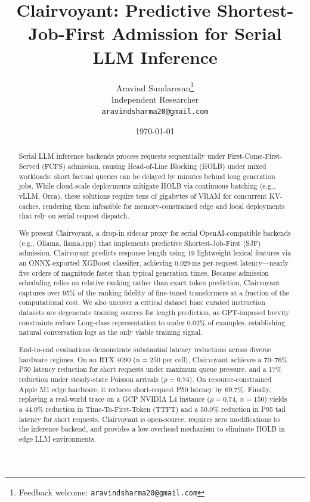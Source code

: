 \documentclass[10pt]{article}
\title{\textbf{Clairvoyant: Predictive Shortest-Job-First Admission for Serial LLM Inference}}
\author{
  Aravind Sundaresan\thanks{Feedback welcome: \texttt{aravindsharma20@gmail.com}} \\
  Independent Researcher \\
  \texttt{aravindsharma20@gmail.com}
}
\date{\today}
\begin{document}
\maketitle

\begin{abstract}
Serial LLM inference backends process requests sequentially under First-Come-First-Served (FCFS) admission, causing Head-of-Line Blocking (HOLB) under mixed workloads: short factual queries can be delayed by minutes behind long generation jobs. While cloud-scale deployments mitigate HOLB via continuous batching (e.g., vLLM, Orca), these solutions require tens of gigabytes of VRAM for concurrent KV-caches, rendering them infeasible for memory-constrained edge and local deployments that rely on serial request dispatch.

We present Clairvoyant, a drop-in sidecar proxy for serial OpenAI-compatible backends (e.g., Ollama, llama.cpp) that implements predictive Shortest-Job-First (SJF) admission. Clairvoyant predicts response length using 19 lightweight lexical features via an ONNX-exported XGBoost classifier, achieving 0.029\,ms per-request latency—nearly five orders of magnitude faster than typical generation times. Because admission scheduling relies on relative ranking rather than exact token prediction, Clairvoyant captures over 95\% of the ranking fidelity of fine-tuned transformers at a fraction of the computational cost. We also uncover a critical dataset bias: curated instruction datasets are degenerate training sources for length prediction, as GPT-imposed brevity constraints reduce Long-class representation to under 0.02\% of examples, establishing natural conversation logs as the only viable training signal.

End-to-end evaluations demonstrate substantial latency reductions across diverse hardware regimes. On an RTX 4090 ($n=250$ per cell), Clairvoyant achieves a 70–76\% P50 latency reduction for short requests under maximum queue pressure, and a 17\% reduction under steady-state Poisson arrivals ($\rho=0.74$). On resource-constrained Apple M1 edge hardware, it reduces short-request P50 latency by 69.7\%. Finally, replaying a real-world trace on a GCP NVIDIA L4 instance ($\rho=0.74$, $n=150$) yields a 44.0\% reduction in Time-To-First-Token (TTFT) and a 50.0\% reduction in P95 tail latency for short requests. Clairvoyant is open-source, requires zero modifications to the inference backend, and provides a low-overhead mechanism to eliminate HOLB in edge LLM environments.
\end{abstract}
\end{document}
